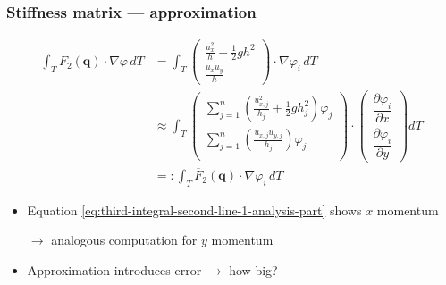 \documentclass{beamer}
\newcommand{\pd}[2]{\dfrac{\partial #1}{\partial #2}}
\renewcommand{\phi}{\varphi}
\begin{document}
\begin{frame}
  \frametitle{Stiffness matrix --- approximation}
  \begin{align}
    \label{eq:third-integral-second-line-1-analysis-part}
    \int_T F_2(\mathbf{q}) \cdot \nabla \phi \, dT & = 
    \int_T
    \begin{pmatrix}
      \frac{u_x^2}{h} + \frac{1}{2} g h^2 \\ \frac{u_x u_y}{h}
    \end{pmatrix}
    \cdot \nabla \phi_i \, dT \\
    \label{eq:third-integral-second-line-2-analysis-part}
    & \approx 
    \int_T
    \begin{pmatrix}
      \sum_{j=1}^n \left(\frac{u_{x,j}^2}{h_j} + \frac{1}{2} g h_j^2\right) \phi_j \\
      \sum_{j=1}^n \left(\frac{u_{x,j} u_{y,j}}{h_j}\right) \phi_j \\
    \end{pmatrix}
    \cdot
    \begin{pmatrix}
      \pd{\phi_i}{x} \\
      \pd{\phi_i}{y}
    \end{pmatrix} dT \\
    & =: \int_T \overline{F}_2(\mathbf{q}) \cdot \nabla \phi_i \,dT
  \end{align}
  \begin{itemize}
  \item Equation \eqref{eq:third-integral-second-line-1-analysis-part} shows $x$ momentum 

    $\rightarrow$ analogous computation for $y$ momentum
  \item Approximation introduces error $\rightarrow$ how big?
  \end{itemize}
\end{frame}
\end{document}
